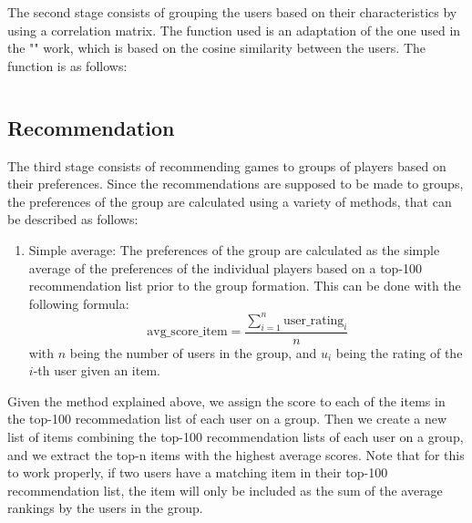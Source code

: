 \documentclass{article}
\begin{document}
The second stage consists of grouping the users based on their characteristics by using a correlation matrix. The function used is an adaptation of the one used in the "" work, which is based on the cosine similarity between the users. The function is as follows:

\begin{equation}
\end{equation}


\subsection{Recommendation}
The third stage consists of recommending games to groups of players based on their preferences. Since the recommendations are supposed to be made to groups, the preferences of the group are calculated using a variety of methods, that can be described as follows:
\begin{enumerate}
    \item Simple average: The preferences of the group are calculated as the simple average of the preferences of the individual players based on a top-100 recommendation list prior to the group formation. This can be done with the following formula:
          \begin{equation}
              \text{avg\_score\_item} = \frac{\sum_{i=1}^{n} \text{user\_rating}_i}{n}
          \end{equation}
          with $n$ being the number of users in the group, and $u_i$ being the rating of the $i$-th user given an item.
\end{enumerate}

Given the method explained above, we assign the score to each of the items in the top-100 recommedation list of each user on a group. Then we create a new list of items combining the top-100 recommendation lists of each user on a group, and we extract the top-n items with the highest average scores. Note that for this to work properly, if two users have a matching item in their top-100 recommendation list, the item will only be included as the sum of the average rankings by the users in the group.
\end{document}
